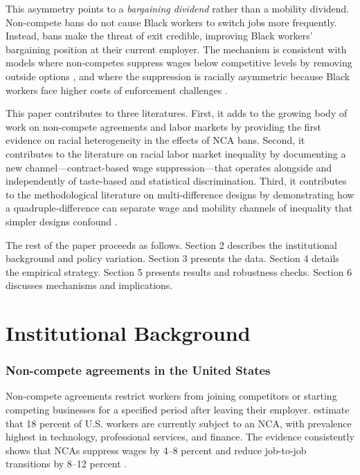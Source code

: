 \documentclass[12pt]{article}
\begin{document}
This asymmetry points to a \emph{bargaining dividend} rather than a mobility dividend. Non-compete bans do not cause Black workers to switch jobs more frequently. Instead, bans make the threat of exit credible, improving Black workers' bargaining position at their current employer. The mechanism is consistent with models where non-competes suppress wages below competitive levels by removing outside options \citep{shi2023noncompete}, and where the suppression is racially asymmetric because Black workers face higher costs of enforcement challenges \citep{krueger2018labor}.

This paper contributes to three literatures. First, it adds to the growing body of work on non-compete agreements and labor markets \citep{marx2009mobility, starr2021noncompete, balasubramanian2022locked, johnson2023consequences, lipsitz2022lowwage} by providing the first evidence on racial heterogeneity in the effects of NCA bans. Second, it contributes to the literature on racial labor market inequality \citep{neal2006why, lang2012racial, bertrand2004emily, kline2022systemic} by documenting a new channel---contract-based wage suppression---that operates alongside and independently of taste-based and statistical discrimination. Third, it contributes to the methodological literature on multi-difference designs by demonstrating how a quadruple-difference can separate wage and mobility channels of inequality that simpler designs confound \citep{callaway2021did, sun2021estimating}.

The rest of the paper proceeds as follows. Section 2 describes the institutional background and policy variation. Section 3 presents the data. Section 4 details the empirical strategy. Section 5 presents results and robustness checks. Section 6 discusses mechanisms and implications.

\section{Institutional Background}

\subsubsection*{Non-compete agreements in the United States} Non-compete agreements restrict workers from joining competitors or starting competing businesses for a specified period after leaving their employer. \citet{starr2021noncompete} estimate that 18 percent of U.S. workers are currently subject to an NCA, with prevalence highest in technology, professional services, and finance. The evidence consistently shows that NCAs suppress wages by 4--8 percent \citep{johnson2023consequences, starr2019consider} and reduce job-to-job transitions by 8--12 percent \citep{balasubramanian2022locked}.
\end{document}
